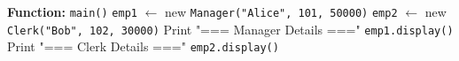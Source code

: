 \begin{algorithm}[H]
\begin{algorithmic}[1]
\STATE

\STATE \textbf{Function:} \texttt{main()}
\STATE \hspace{1em} \texttt{emp1} $\gets$ new \texttt{Manager("Alice", 101, 50000)}
\STATE \hspace{1em} \texttt{emp2} $\gets$ new \texttt{Clerk("Bob", 102, 30000)}
\STATE \hspace{1em} Print "=== Manager Details ==="
\STATE \hspace{1em} \texttt{emp1.display()}
\STATE \hspace{1em} Print "=== Clerk Details ==="
\STATE \hspace{1em} \texttt{emp2.display()}

\end{algorithmic}
\end{algorithm}